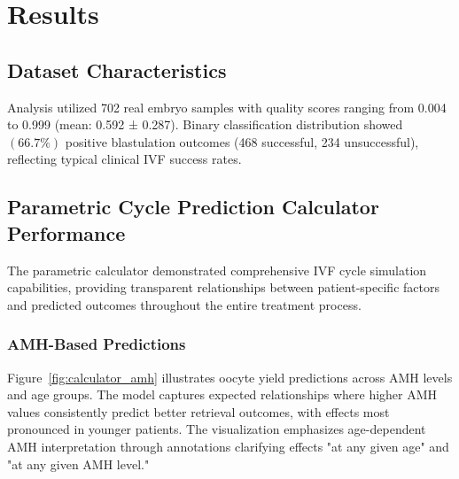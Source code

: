 \section{Results}\label{sec:results}

\subsection{Dataset Characteristics}

Analysis utilized 702 real embryo samples with quality scores ranging from 0.004 to 0.999 (mean: 0.592 ± 0.287). Binary classification distribution showed $(66.7\%)$ positive blastulation outcomes (468 successful, 234 unsuccessful), reflecting typical clinical IVF success rates.

\subsection{Parametric Cycle Prediction Calculator Performance}

The parametric calculator demonstrated comprehensive IVF cycle simulation capabilities, providing transparent relationships between patient-specific factors and predicted outcomes throughout the entire treatment process.

\subsubsection{AMH-Based Predictions}

Figure~\ref{fig:calculator_amh} illustrates oocyte yield predictions across AMH levels and age groups. The model captures expected relationships where higher AMH values consistently predict better retrieval outcomes, with effects most pronounced in younger patients. The visualization emphasizes age-dependent AMH interpretation through annotations clarifying effects "at any given age" and "at any given AMH level."

